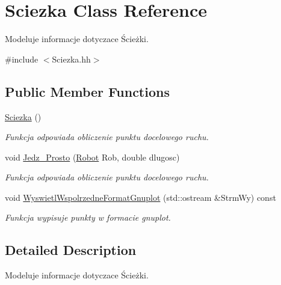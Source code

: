 \hypertarget{class_sciezka}{\section{Sciezka Class Reference}
\label{class_sciezka}
}


Modeluje informacje dotyczace Ścieżki.  




{\ttfamily \#include $<$Sciezka.\+hh$>$}

\subsection*{Public Member Functions}
\begin{DoxyCompactItemize}
\item 
\hypertarget{class_sciezka_a95e9a0c51da72e4bd4edcca9f9ea7de4}{\hyperlink{class_sciezka_a95e9a0c51da72e4bd4edcca9f9ea7de4}{Sciezka} ()}\label{class_sciezka_a95e9a0c51da72e4bd4edcca9f9ea7de4}

\begin{DoxyCompactList}\small\item\em Funkcja odpowiada obliczenie punktu docelowego ruchu. \end{DoxyCompactList}\item 
\hypertarget{class_sciezka_ad3deb6dbce1958b476fa1a7cebfafd73}{void \hyperlink{class_sciezka_ad3deb6dbce1958b476fa1a7cebfafd73}{Jedz\+\_\+\+Prosto} (\hyperlink{class_robot}{Robot} Rob, double dlugosc)}\label{class_sciezka_ad3deb6dbce1958b476fa1a7cebfafd73}

\begin{DoxyCompactList}\small\item\em Funkcja odpowiada obliczenie punktu docelowego ruchu. \end{DoxyCompactList}\item 
\hypertarget{class_sciezka_a9fc6b8104ec42ffd5146fe4ca8ddd1ac}{void \hyperlink{class_sciezka_a9fc6b8104ec42ffd5146fe4ca8ddd1ac}{Wyswietl\+Wspolrzedne\+Format\+Gnuplot} (std\+::ostream \&Strm\+Wy) const }\label{class_sciezka_a9fc6b8104ec42ffd5146fe4ca8ddd1ac}

\begin{DoxyCompactList}\small\item\em Funkcja wypisuje punkty w formacie gnuplot. \end{DoxyCompactList}\end{DoxyCompactItemize}


\subsection{Detailed Description}
Modeluje informacje dotyczace Ścieżki. 

